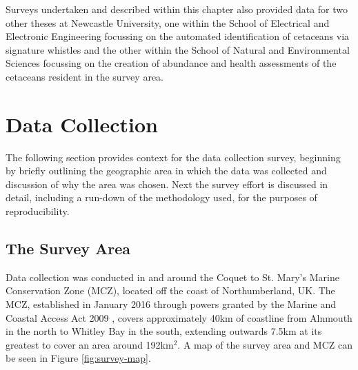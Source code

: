 Surveys undertaken and described within this chapter also provided data for two other theses at Newcastle University, one within the School of Electrical and Electronic Engineering focussing on the automated identification of cetaceans via signature whistles and the other within the School of Natural and Environmental Sciences focussing on the creation of abundance and health assessments of the cetaceans resident in the survey area.

\section{Data Collection}\label{ch:NDD,sec:dataCollection}

The following section provides context for the data collection survey, beginning by briefly outlining the geographic area in which the data was collected and discussion of why the area was chosen. Next the survey effort is discussed in detail, including a run-down of the methodology used, for the purposes of reproducibility. 

\subsection{The Survey Area}\label{ch:NDD,sec:dataCollection,sub:surveyArea}

Data collection was conducted in and around the Coquet to St. Mary's Marine Conservation Zone (MCZ), located off the coast of Northumberland, UK. The MCZ, established in January 2016 through powers granted by the Marine and Coastal Access Act 2009 \cite{noauthor_marine_2009}, covers approximately 40km of coastline from Alnmouth in the north to Whitley Bay in the south, extending outwards 7.5km at its greatest to cover an area around 192km$^{2}$. A map of the survey area and MCZ can be seen in Figure \ref{fig:survey-map}.

